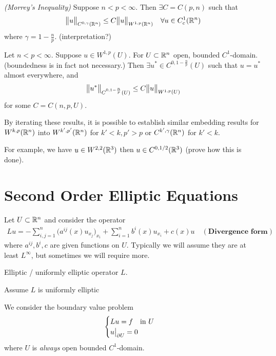 \documentclass[10pt,a4paper]{report}
\begin{document}
\thm \emph{(Morrey's Inequality)} Suppose $n<p<\infty$. Then $\exists C = C(p,n)$ such that
\begin{align*}
\bigl\lVert u\bigr\rVert_{C^{0,\gamma}(\mathbb{R}^n)} \leq C\bigl\lVert u\bigr\rVert_{W^{1,p}(\mathbb{R}^n)} \quad \forall u \in C_c^1(\mathbb{R}^n)
\end{align*}
where $\gamma = 1-\frac{n}{p}$. (interpretation?)
\s

\corr Let $n< p < \infty$. Suppose $u \in W^{1,p} (U)$. For $U\subset \mathbb{R}^n$ open, bounded $C^{1}$-domain. (boundedness is in fact not necessary.) Then $\exists u^* \in C^{0,1-\frac{n}{p}}(U)$ such that $u = u^*$ almost everywhere, and
\begin{align*}
\bigl\lVert u^*\bigr\rVert_{C^{0,1-\frac{n}{p}}(U)} \leq C \bigl\lVert u\bigr\rVert_{W^{1,p}(U)}
\end{align*}
for some $C = C(n,p,U)$.
\s

By iterating these results, it is possible to establish similar embedding results for $W^{k,p}(\mathbb{R}^n)$ into $W^{k',p'}(\mathbb{R}^n)$ for $k'<k, p'>p$ or $C^{k',\gamma}(\mathbb{R}^n)$ for $k'<k$.
\s

For example, we have $u \in W^{2,2}(\mathbb{R}^3)$ then $u \in C^{0,1/2}(\mathbb{R}^3)$ (prove how this is done).
\s

\section*{Second Order Elliptic Equations}

Let $U\subset \mathbb{R}^n$ and consider the operator
\begin{align*}
Lu = - \sum_{i,j=1}^n \big( a^{ij}(x) u_{x_j} \big)_{x_i} + \sum_{i=1}^n b^i (x) u_{x_i} + c(x)u \quad (\textbf{Divergence form})
\end{align*}
where $a^{ij},b^i,c$ are given functions on $U$. Typically we will assume they are at least $L^{\infty}$, but sometimes we will require more. 
\s

 Elliptic / uniformly elliptic operator $L$.
\s

Assume $L$ is uniformly elliptic\s
\s

We consider the boundary value problem
\begin{align}
\begin{cases} 
Lu = f \quad \text{in } U \\
u\big|_{\partial U} =0
\end{cases} \label{12}
\end{align} 
where $U$ is \emph{always} open bounded $C^1$-domain.
\s
\end{document}
